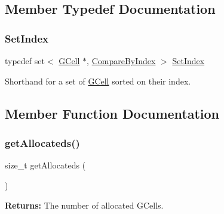 \subsection{Member Typedef Documentation}
\mbox{\label{classKatabatic_1_1GCell_aacb1c215b203bfba5729f135b3221d40}} 
\subsubsection{\texorpdfstring{Set\+Index}{SetIndex}}
{\footnotesize\ttfamily typedef set$<$ \mbox{\hyperlink{classKatabatic_1_1GCell}{G\+Cell}} $\ast$, \mbox{\hyperlink{classKatabatic_1_1GCell_1_1CompareByIndex}{Compare\+By\+Index}} $>$ \mbox{\hyperlink{classKatabatic_1_1GCell_aacb1c215b203bfba5729f135b3221d40}{Set\+Index}}}

Shorthand for a set of \mbox{\hyperlink{classKatabatic_1_1GCell}{G\+Cell}} sorted on their index. 

\subsection{Member Function Documentation}
\mbox{\label{classKatabatic_1_1GCell_a91c8bc1a6bdb1b15c3c084ebfd38af47}} 
\subsubsection{\texorpdfstring{get\+Allocateds()}{getAllocateds()}}
{\footnotesize\ttfamily size\+\_\+t get\+Allocateds (\begin{DoxyParamCaption}{ }\end{DoxyParamCaption})\hspace{0.3cm}{\ttfamily [static]}}

{\bfseries Returns\+:} The number of allocated G\+Cells. \mbox{\label{classKatabatic_1_1GCell_ac594cb2832ee7ef410c89499258d38fd}} 
